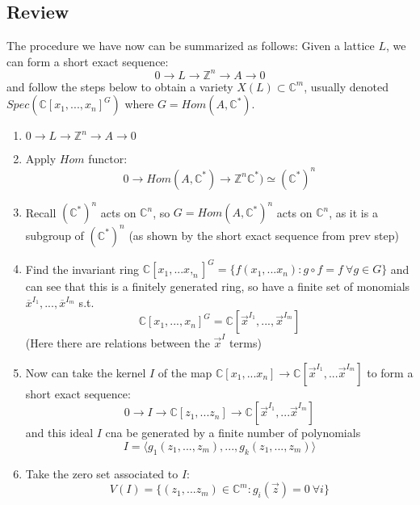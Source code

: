 \documentclass{article}
\newcommand{\C}{\mathbb{C}}
\newcommand{\Z}{\mathbb{Z}}
\begin{document}
	\subsection{Review}
	The procedure we have now can be summarized as follows: 
	Given a lattice $L$, we can form a short exact sequence: 
	$$0\to L\to\Z^n\to A\to0$$
	and follow the steps below to obtain a variety 
	$X(L)\subset\C^m$, usually denoted $Spec(
	\C[x_1,...,x_n]^G)$ where $G=Hom(A,\C^*)$. 
	\begin{enumerate}
		\item $0\to L\to\Z^n\to A\to0$
		\item Apply $Hom$ functor: 
		$$0\to Hom(A,\C^*)\to\Z^n
		\C^*)\simeq (\C^*)^n$$
		\item Recall $(\C^*)^n$ acts on 
		$\C^n$, so $G=Hom(A,\C^*)^n$ 
		acts on $\C^n$, as it is a subgroup 
		of $(\C^*)^n$ (as shown by the short 
		exact sequence from prev step)
		\item Find the invariant ring $\C
		[x_1,...x,_n]^G=\{f(x_1,...x_n):g\circ f=
		f~\forall g\in G\}$ and can see that this is 
		a finitely generated ring, so have a finite 
		set of monomials $\overline{x}^{I_1},...,
		\overline{x}^{I_m}$ s.t. 
		$$\C[x_1,...,x_n]^G=
		\C[\vec{x}^{I_1},...,\vec{x}^{I_m}]$$ 
		(Here there are relations between the 
		$\vec{x}^I$ terms)
		\item Now can take the kernel $I$ of the map 
		$\C[x_1,...x_n]\to\C
		[\vec{x}^{I_1},...\vec{x}^{I_m}]$ 
		to form a short exact sequence: 
		$$0\to I\to\C[z_1,...z_n]\to
		\C[\vec{x}^{I_1},...\vec{x}^{I_m}]$$
		and this ideal $I$ cna be generated by a 
		finite number of polynomials $$I=\langle 
		g_1(z_1,...,z_m),...,g_k(z_1,...,z_m)\rangle$$
		\item Take the zero set associated to $I$: 
		$$V(I) = \{(z_1,...z_m)\in\C^m: 
		g_i(\vec{z})=0~\forall i\}$$
	\end{enumerate}
\end{document}
